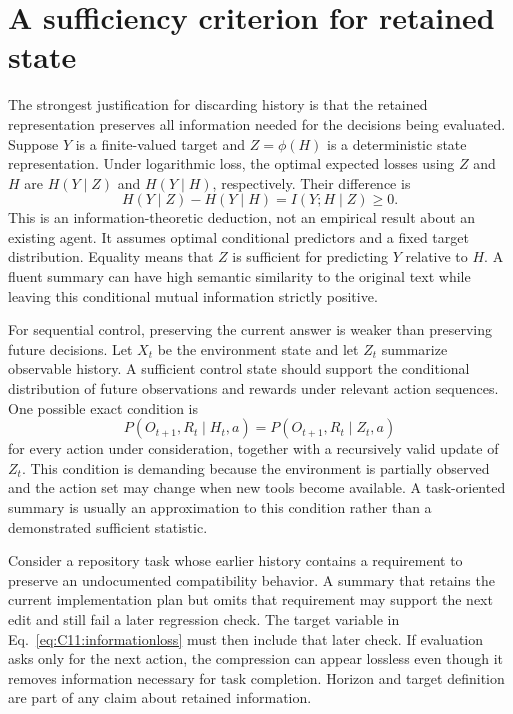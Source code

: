 \section{A sufficiency criterion for retained state}\label{sec:C11:sufficiency}
The strongest justification for discarding history is that the retained representation preserves all information needed for the decisions being evaluated. Suppose $Y$ is a finite-valued target and $Z=\phi(H)$ is a deterministic state representation. Under logarithmic loss, the optimal expected losses using $Z$ and $H$ are $H(Y\mid Z)$ and $H(Y\mid H)$, respectively. Their difference is
\begin{equation}
 H(Y\mid Z)-H(Y\mid H)=I(Y;H\mid Z)\geq0.
 \label{eq:C11:informationloss}
\end{equation}
This is an information-theoretic deduction, not an empirical result about an existing agent. It assumes optimal conditional predictors and a fixed target distribution. Equality means that $Z$ is sufficient for predicting $Y$ relative to $H$. A fluent summary can have high semantic similarity to the original text while leaving this conditional mutual information strictly positive.

For sequential control, preserving the current answer is weaker than preserving future decisions. Let $X_t$ be the environment state and let $Z_t$ summarize observable history. A sufficient control state should support the conditional distribution of future observations and rewards under relevant action sequences. One possible exact condition is
\begin{equation}
 P(O_{t+1},R_t\mid H_t,a)=P(O_{t+1},R_t\mid Z_t,a)
\end{equation}
for every action under consideration, together with a recursively valid update of $Z_t$. This condition is demanding because the environment is partially observed and the action set may change when new tools become available. A task-oriented summary is usually an approximation to this condition rather than a demonstrated sufficient statistic.

Consider a repository task whose earlier history contains a requirement to preserve an undocumented compatibility behavior. A summary that retains the current implementation plan but omits that requirement may support the next edit and still fail a later regression check. The target variable in Eq.~\eqref{eq:C11:informationloss} must then include that later check. If evaluation asks only for the next action, the compression can appear lossless even though it removes information necessary for task completion. Horizon and target definition are part of any claim about retained information.

